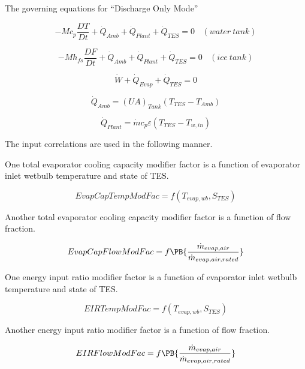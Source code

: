The governing equations for ``Discharge Only Mode''

\begin{equation}
-M{c_p}\frac{{DT}}{{Dt}} + {\dot Q_{Amb}} + {\dot Q_{Plant}} + {\dot Q_{TES}} = 0 ~~~~ (water~tank)
\end{equation}

\begin{equation}
-M{h_{fs}}\frac{{DF}}{{Dt}} + {\dot Q_{Amb}} + {\dot Q_{Plant}} + {\dot Q_{TES}} = 0 ~~~~ (ice~tank)
\end{equation}

\begin{equation}
\dot W + {\dot Q_{Evap}} + {\dot Q_{TES}} = 0
\end{equation}

\begin{equation}
{\dot Q_{Amb}} = {\left( {UA} \right)_{Tank}}\left( {{T_{TES}} - {T_{Amb}}} \right)
\end{equation}

\begin{equation}
{\dot Q_{Plant}} = \dot m{c_p}\varepsilon \left( {{T_{TES}} - {T_{w,in}}} \right)
\end{equation}

The input correlations are used in the following manner.

One total evaporator cooling capacity modifier factor is a function of evaporator inlet wetbulb temperature and state of TES.

\begin{equation}
EvapCapTempModFac = f\left( {{T_{evap,wb}},{S_{TES}}} \right)
\end{equation}

Another total evaporator cooling capacity modifier factor is a function of flow fraction.

\begin{equation}
EvapCapFlowModFac = f\PB{\frac{\dot{m}_{evap,air}}{\dot{m}_{evap,air,rated}}}
\end{equation}

One energy input ratio modifier factor is a function of evaporator inlet wetbulb temperature and state of TES.

\begin{equation}
EIRTempModFac = f\left( {{T_{evap,wb}},{S_{TES}}} \right)
\end{equation}

Another energy input ratio modifier factor is a function of flow fraction.

\begin{equation}
EIRFlowModFac = f\PB{\frac{\dot{m}_{evap,air}}{\dot{m}_{evap,air,rated}}}
\end{equation}

